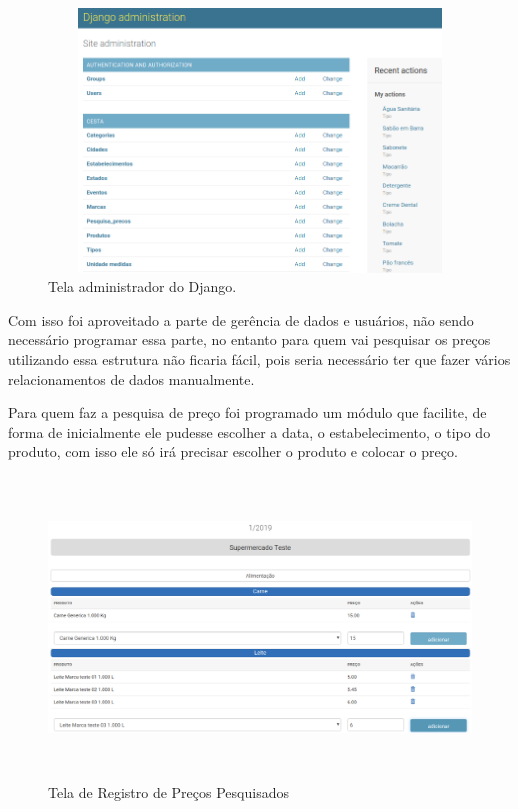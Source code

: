 \documentclass{ifto-tex}
\begin{document}
	\begin{figure}[H]
	\begin{center}
		\includegraphics[width=16.0cm, height= 7.0cm]{cestaadmin.png}    %
		\caption{Tela administrador do Django.} 
		\label{fig:faces}
	\end{center}
\end{figure}
Com isso foi aproveitado a parte de gerência de dados e usuários, não sendo necessário programar essa parte, no entanto para quem vai pesquisar os preços utilizando essa estrutura não ficaria fácil, pois seria necessário ter que fazer vários relacionamentos de dados manualmente.

Para quem faz a pesquisa de preço foi programado um módulo que facilite, de forma de inicialmente ele pudesse escolher a data, o estabelecimento, o tipo do produto, com isso ele só irá precisar escolher o produto e colocar o preço.

	\begin{figure}[H]
	\begin{center}
		\includegraphics[width=16.0cm, height= 8.0cm]{cestacadastro.png}    %
		\caption{Tela de Registro de Preços Pesquisados} 
		\label{fig:faces}
	\end{center}
\end{figure}
\end{document}
